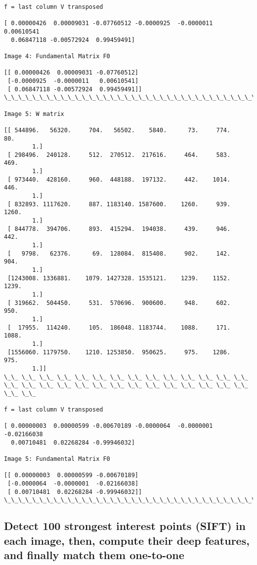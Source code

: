 \documentclass[11pt]{article}
\begin{document}
\begin{Verbatim}[commandchars=\\\{\}]
f = last column V transposed 

[ 0.00000426  0.00009031 -0.07760512 -0.0000925  -0.0000011   0.00610541
  0.06847118 -0.00572924  0.99459491]

Image 4: Fundamental Matrix F0

[[ 0.00000426  0.00009031 -0.07760512]
 [-0.0000925  -0.0000011   0.00610541]
 [ 0.06847118 -0.00572924  0.99459491]]
\_\_\_\_\_\_\_\_\_\_\_\_\_\_\_\_\_\_\_\_\_\_\_\_\_\_\_\_\_\_\_\_\_\_\_\_\_\_\_\_\_\_\_\_\_\_\_\_\_\_\_\_\_\_\_\_\_\_\_\_\_\_\_\_\_\_\_\_\_\_\_\_\_\_\_\_\_\_\_\_\_\_\_\_

Image 5: W matrix

[[ 544896.   56320.     704.   56502.    5840.      73.     774.      80.
        1.]
 [ 298496.  240128.     512.  270512.  217616.     464.     583.     469.
        1.]
 [ 973440.  428160.     960.  448188.  197132.     442.    1014.     446.
        1.]
 [ 832893. 1117620.     887. 1183140. 1587600.    1260.     939.    1260.
        1.]
 [ 844778.  394706.     893.  415294.  194038.     439.     946.     442.
        1.]
 [   9798.   62376.      69.  128084.  815408.     902.     142.     904.
        1.]
 [1243008. 1336881.    1079. 1427328. 1535121.    1239.    1152.    1239.
        1.]
 [ 319662.  504450.     531.  570696.  900600.     948.     602.     950.
        1.]
 [  17955.  114240.     105.  186048. 1183744.    1088.     171.    1088.
        1.]
 [1556060. 1179750.    1210. 1253850.  950625.     975.    1286.     975.
        1.]]
\_\_ \_\_ \_\_ \_\_ \_\_ \_\_ \_\_ \_\_ \_\_ \_\_ \_\_ \_\_ \_\_ \_\_ \_\_ \_\_ \_\_ \_\_ \_\_ \_\_ \_\_ \_\_ \_\_ \_\_ \_\_ \_\_ \_\_ \_\_ \_\_ \_\_

f = last column V transposed 

[ 0.00000003  0.00000599 -0.00670189 -0.0000064  -0.0000001  -0.02166038
  0.00710481  0.02268284 -0.99946032]

Image 5: Fundamental Matrix F0

[[ 0.00000003  0.00000599 -0.00670189]
 [-0.0000064  -0.0000001  -0.02166038]
 [ 0.00710481  0.02268284 -0.99946032]]
\_\_\_\_\_\_\_\_\_\_\_\_\_\_\_\_\_\_\_\_\_\_\_\_\_\_\_\_\_\_\_\_\_\_\_\_\_\_\_\_\_\_\_\_\_\_\_\_\_\_\_\_\_\_\_\_\_\_\_\_\_\_\_\_\_\_\_\_\_\_\_\_\_\_\_\_\_\_\_\_\_\_\_\_

    \end{Verbatim}

    \hypertarget{detect-100-strongest-interest-points-sift-in-each-image-then-compute-their-deep-features-and-finally-match-them-one-to-one}{%
\subsection{Detect 100 strongest interest points (SIFT) in each image,
then, compute their deep features, and finally match them
one-to-one}\label{detect-100-strongest-interest-points-sift-in-each-image-then-compute-their-deep-features-and-finally-match-them-one-to-one}}
\end{document}
